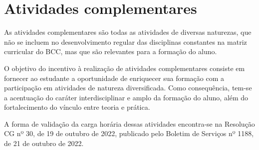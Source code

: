 \section{Atividades complementares}
\label{sec:atividades_complementares}

As atividades complementares são todas as atividades de diversas naturezas, que
não se incluem no desenvolvimento regular das disciplinas constantes na matriz
curricular do BCC, mas que são relevantes para a formação do aluno.

O objetivo do incentivo à realização de atividades complementares consiste em
fornecer ao estudante a oportunidade de enriquecer sua formação com a
participação em atividades de natureza diversificada. 
Como consequência, tem-se a acentuação do caráter interdisciplinar e amplo da
formação do aluno, além do fortalecimento do vínculo entre teoria e prática.


A forma de validação da carga horária dessas atividades encontra-se na
Resolução CG nº 30, de 19 de outubro de 2022, publicado pelo Boletim de
Serviços nº 1188, de 21 de outubro de 2022.
